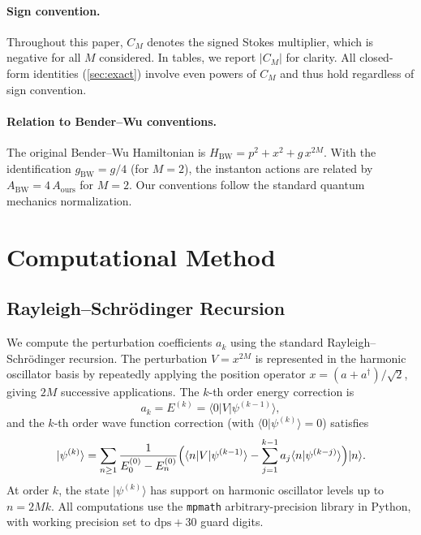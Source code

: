 \documentclass[12pt,a4paper]{article}
\numberwithin{equation}{section}
\theoremstyle{plain}
\theoremstyle{definition}
\theoremstyle{remark}
\begin{document}
\paragraph{Sign convention.}
Throughout this paper, $C_M$ denotes the signed Stokes multiplier, which
is negative for all $M$ considered. In tables, we report $|C_M|$ for
clarity. All closed-form identities (\cref{sec:exact}) involve even
powers of $C_M$ and thus hold regardless of sign convention.

\paragraph{Relation to Bender--Wu conventions.}
The original Bender--Wu Hamiltonian is
$H_{\text{BW}} = p^2 + x^2 + g\,x^{2M}$. With the identification
$g_{\text{BW}} = g/4$ (for $M = 2$), the instanton actions are related by
$A_{\text{BW}} = 4\,A_{\text{ours}}$ for $M = 2$. Our conventions follow
the standard quantum mechanics normalization.

\section{Computational Method}
\label{sec:method}

\subsection{Rayleigh--Schr\"odinger Recursion}
\label{sec:RS}

We compute the perturbation coefficients $a_k$ using the standard
Rayleigh--Schr\"odinger recursion. The perturbation $V = x^{2M}$ is
represented in the harmonic oscillator basis by repeatedly applying the
position operator $x = (a + a^\dagger)/\sqrt{2}$, giving $2M$ successive
applications. The $k$-th order energy correction is
\begin{equation}\label{eq:Ek}
  a_k = E^{(k)} = \langle 0 | V | \psi^{(k-1)} \rangle,
\end{equation}
and the $k$-th order wave function correction (with $\langle 0 | \psi^{(k)}\rangle = 0$) satisfies
\begin{equation}\label{eq:psik}
  | \psi^{(k)} \rangle = \sum_{n \ge 1} \frac{1}{E_0^{(0)} - E_n^{(0)}}
  \Bigl( \langle n | V | \psi^{(k-1)} \rangle
  - \sum_{j=1}^{k-1} a_j \langle n | \psi^{(k-j)} \rangle \Bigr) | n \rangle.
\end{equation}
At order $k$, the state $|\psi^{(k)}\rangle$ has support on harmonic oscillator
levels up to $n = 2Mk$. All computations use the \texttt{mpmath} arbitrary-precision
library in Python, with working precision set to $\mathrm{dps} + 30$ guard digits.
\end{document}
